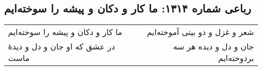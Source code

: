 \begin{center}
\section*{رباعی شماره ۱۳۱۴: ما کار و دکان و پیشه را سوخته‌ایم}
\label{sec:1314}
\begin{longtable}{l p{0.5cm} r}
ما کار و دکان و پیشه را سوخته‌ایم
&&
شعر و غزل و دو بیتی آموخته‌ایم
\\
در عشق که او جان و دل و دیدهٔ ماست
&&
جان و دل و دیده هر سه بردوخته‌ایم
\\
\end{longtable}
\end{center}

